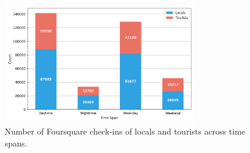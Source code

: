 \documentclass{article}
\theoremstyle{remark}
\begin{document}
\begin{figure}[!h]
\centering
\includegraphics[width=0.75\textwidth]{figures/foursquare_checkins_count.png}
\caption{\label{fig:foursquare_checkins_count}Number of Foursquare check-ins of locals and tourists across time spans.}
\end{figure}
\end{document}
